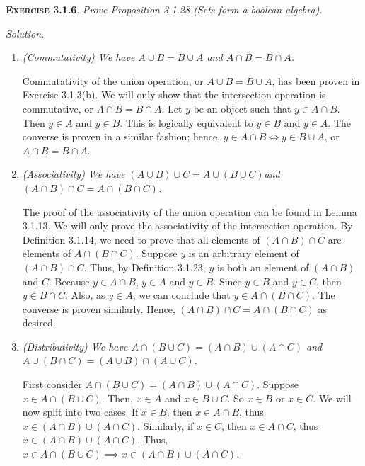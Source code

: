 \documentclass[12pt]{article}
\theoremstyle{remark}
\newenvironment{exer}[2]{
    \noindent \setlength{\parskip}{1em}%
    \textsc{\textbf{Exercise #1}}. \textit{#2} \par
    \noindent \textit{Solution.} %
}{\bigskip}
\begin{document}
\begin{exer}{3.1.6}{
    Prove Proposition 3.1.28 (Sets form a boolean algebra).
}
\begin{enumerate}[topsep=0mm, label=(\alph*)]
        \item \textit{(Commutativity) We have $A \cup B = B \cup A$ and $A \cap B = B \cap A$.}

            Commutativity of the union operation, or $A \cup B = B \cup A$, has been proven in Exercise 3.1.3(b).
            We will only show that the intersection operation is commutative, or $A \cap B = B \cap A$.
            Let $y$ be an object such that $y \in A \cap B$.
            Then $y \in A$ and $y \in B$.
            This is logically equivalent to $y \in B$ and $y \in A$.
            The converse is proven in a similar fashion; hence, $y \in A \cap B \iff y \in B \cup A$, or $A \cap B = B \cap A$.
        
        \item \textit{(Associativity) We have $(A \cup B) \cup C = A \cup (B \cup C)$and $(A \cap B) \cap C = A \cap (B \cap C)$.}

            The proof of the associativity of the union operation can be found in Lemma 3.1.13.
            We will only prove the associativity of the intersection operation.
            By Definition 3.1.14, we need to prove that all elements of $(A \cap B) \cap C$ are elements of $A \cap (B \cap C)$.
            Suppose $y$ is an arbitrary element of $(A \cap B) \cap C$.
            Thus, by Definition 3.1.23, $y$ is both an element of $(A \cap B)$ and $C$.
            Because $y \in A \cap B$, $y \in A$ and $y \in B$.
            Since $y \in B$ and $y \in C$, then $y \in B \cap C$.
            Also, as $y \in A$, we can conclude that $y \in A \cap (B \cap C)$.
            The converse is proven similarly.
            Hence, $(A \cap B) \cap C = A \cap (B \cap C)$ as desired.
        
        \item \textit{(Distributivity) We have $A \cap (B \cup C) = (A \cap B) \cup (A \cap C)$ and $A \cup (B \cap C)=(A \cup B) \cap (A \cup C)$.}

            First consider $A \cap (B \cup C) = (A \cap B) \cup (A \cap C)$.
            Suppose $x \in A \cap (B \cup C)$.
            Then, $x \in A$ and $x \in B \cup C$.
            So $x \in B$ or $x \in C$.
            We will now split into two cases.
            If $x \in B$, then $x \in A \cap B$, thus $x \in (A \cap B) \cup (A \cap C)$.
            Similarly, if $x \in C$, then $x \in A \cap C$, thus $x \in (A \cap B) \cup (A \cap C)$.
            Thus, $x \in A \cap (B \cup C) \implies x \in (A \cap B) \cup (A \cap C)$.
            

\end{enumerate}
\end{exer}
\end{document}
